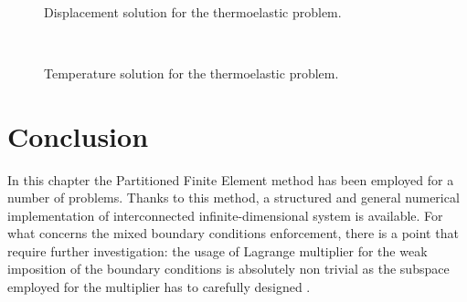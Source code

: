 \begin{figure}[htbp]%
	\centering
	\hspace{8pt}%
	 \\
	\caption[]{Displacement solution for the thermoelastic problem.}%
	\label{fig:u_therElas}%
\end{figure}

\begin{figure}[htbp]%
	\centering
	\hspace{8pt}%
	 \\
	\caption[]{Temperature solution for the thermoelastic problem.}%
	\label{fig:theta_therElas}%
\end{figure}


\section{Conclusion}
In this chapter the Partitioned Finite Element method has been employed for a number of problems.
Thanks to this method, a structured and general numerical implementation of interconnected infinite-dimensional system is available. For what concerns the mixed boundary conditions enforcement, there is a point that require further investigation: the usage of Lagrange multiplier for the weak imposition of the boundary conditions is absolutely non trivial as the subspace employed for the multiplier has to carefully designed \cite{pitkaranta1979boundary,pitkaranta1980local,pitkaranta1981finite}.












